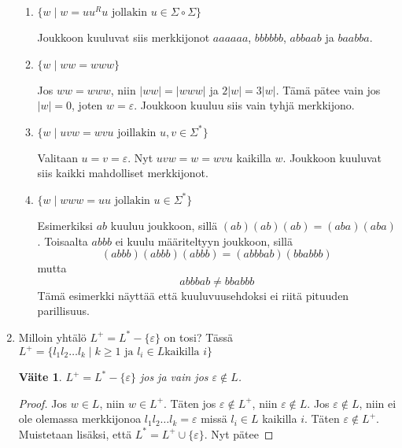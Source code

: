\documentclass[a4paper,11pt,draft]{article}
\newtheorem*{claim}{Väite}
\begin{document}
\begin{enumerate}
  \begin{enumerate}
  \item
    $\{w \mid w = uu^Ru \text{ jollakin } u \in \Sigma \circ
    \Sigma\}$

    Joukkoon kuuluvat siis merkkijonot $aaaaaa$, $bbbbbb$, $abbaab$
    ja $baabba$.

  \item
    $\{w \mid ww = www\}$

    Jos $ww = www$, niin $|ww| = |www|$ ja $2|w| = 3|w|$.
    Tämä pätee vain jos $|w| = 0$, joten $w = \varepsilon$. Joukkoon
    kuuluu siis vain tyhjä merkkijono.

  \item
    $\{w \mid uvw = wvu \text{ joillakin } u,v \in \Sigma^*\}$

    Valitaan $u = v = \varepsilon$. Nyt $uvw = w = wvu$ kaikilla
    $w$. Joukkoon kuuluvat siis kaikki mahdolliset merkkijonot.

  \item
    $\{w \mid www = uu \text{ jollakin } u \in \Sigma^*\}$

    Esimerkiksi $ab$ kuuluu joukkoon, sillä $(ab)(ab)(ab) =
    (aba)(aba)$. Toisaalta $abbb$ ei kuulu määriteltyyn joukkoon,
    sillä
    \begin{equation*}
    (abbb)(abbb)(abbb) = (abbbab)(bbabbb)
    \end{equation*}
    mutta
    \begin{equation*}
      abbbab \neq bbabbb
    \end{equation*}
    Tämä esimerkki näyttää että kuuluvuusehdoksi ei riitä pituuden
    parillisuus.
  \end{enumerate}

\newpage
\item
  Milloin yhtälö $L^+ = L^* - \{\varepsilon\}$ on tosi? Tässä $L^+ =
  \{l_1l_2 \ldots l_k \mid k \ge 1 \text{ ja } l_i \in L \text{
    kaikilla } i\}$

  \begin{claim}
    $L^+ = L^* - \{\varepsilon\}$ jos ja vain jos $\varepsilon \notin L$.
  \end{claim}

  \begin{proof}
    Jos $w \in L$, niin $w \in L^+$. Täten jos $\varepsilon \notin
    L^+$, niin $\varepsilon \notin L$. Jos $\varepsilon \notin L$,
    niin ei ole olemassa merkkijonoa $l_1l_2 \ldots l_k =
    \varepsilon$ missä $l_i \in L$ kaikilla $i$. Täten $\varepsilon
    \notin L^+$. Muistetaan lisäksi, että $L^* = L^+ \cup
    \{\varepsilon\}$. Nyt pätee


\end{proof}
\end{enumerate}
\end{document}
